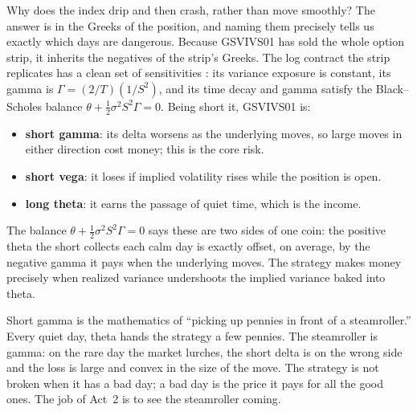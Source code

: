 Why does the index drip and then crash, rather than move smoothly? The answer is in the Greeks of the position, and naming them precisely tells us exactly which days are dangerous. Because GSVIVS01 has sold the whole option strip, it inherits the negatives of the strip's Greeks. The log contract the strip replicates has a clean set of sensitivities \citep[Eqs.~9--12, p.~12]{Demeterfi1999}: its variance exposure is constant, its gamma is $\Gamma = (2/T)(1/S^2)$, and its time decay and gamma satisfy the Black--Scholes balance $\theta + \tfrac12\sigma^2 S^2 \Gamma = 0$. Being short it, GSVIVS01 is:
\begin{itemize}
  \item \textbf{short gamma}: its delta worsens as the underlying moves, so large moves in either direction cost money; this is the core risk.
  \item \textbf{short vega}: it loses if implied volatility rises while the position is open.
  \item \textbf{long theta}: it earns the passage of quiet time, which is the income.
\end{itemize}
The balance $\theta + \tfrac12\sigma^2 S^2\Gamma = 0$ says these are two sides of one coin: the positive theta the short collects each calm day is exactly offset, on average, by the negative gamma it pays when the underlying moves. The strategy makes money precisely when realized variance undershoots the implied variance baked into theta.

\begin{intuition}
Short gamma is the mathematics of ``picking up pennies in front of a steamroller.'' Every quiet day, theta hands the strategy a few pennies. The steamroller is gamma: on the rare day the market lurches, the short delta is on the wrong side and the loss is large and convex in the size of the move. The strategy is not broken when it has a bad day; a bad day is the price it pays for all the good ones. The job of Act~2 is to see the steamroller coming.
\end{intuition}

